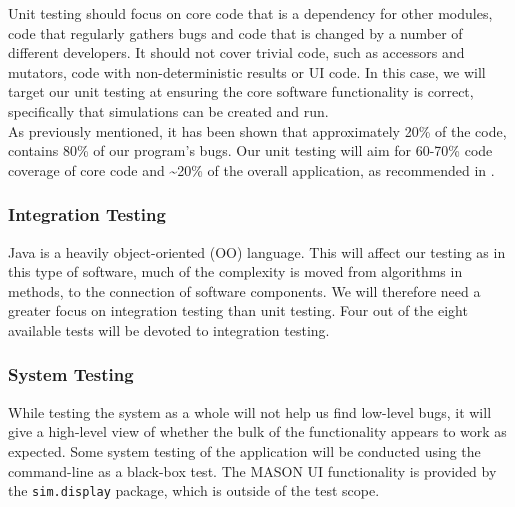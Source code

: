 \documentclass[11pt]{article}
\begin{document}
Unit testing should focus on core code that is a dependency for other modules, code that regularly gathers bugs and code that is changed by a number of different developers.
It should not cover trivial code, such as accessors and mutators, code with non-deterministic results or UI code.\cite{dont_test_blindly}
In this case, we will target our unit testing at ensuring the core software functionality is correct, specifically that simulations can be created and run.
\\

As previously mentioned, it has been shown that approximately 20\% of the code, contains 80\% of our program's bugs.
Our unit testing will aim for 60-70\% code coverage of core code and \textasciitilde 20\% of the overall application, as recommended in \cite{dont_test_blindly}.

\subsubsection{Integration Testing}

Java is a heavily object-oriented (OO) language. This will affect our testing as in this type of software, much of the complexity is moved from algorithms in methods, to the connection of software components\cite[pp.236]{introduction_book}. We will therefore need a greater focus on integration testing than unit testing. Four out of the eight available tests will be devoted to integration testing. 




\subsubsection{System Testing}
While testing the system as a whole will not help us find low-level bugs, it will give a high-level view of whether the bulk of the functionality appears to work as expected.
Some system testing of the application will be conducted using the command-line as a black-box test.
The MASON UI functionality is provided by the \texttt{sim.display} package, which is outside of the test scope.
\\
\end{document}
